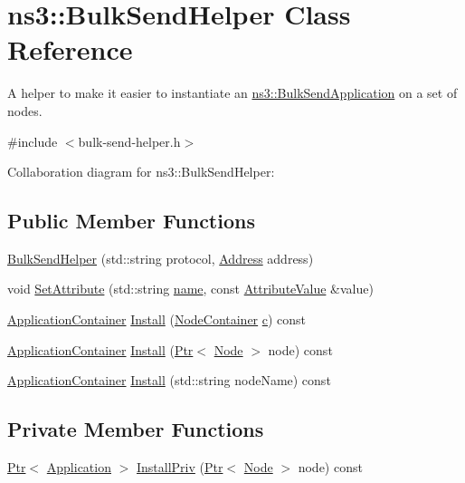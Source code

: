 \hypertarget{classns3_1_1BulkSendHelper}{}\section{ns3\+:\+:Bulk\+Send\+Helper Class Reference}
\label{classns3_1_1BulkSendHelper}


A helper to make it easier to instantiate an \hyperlink{classns3_1_1BulkSendApplication}{ns3\+::\+Bulk\+Send\+Application} on a set of nodes.  




{\ttfamily \#include $<$bulk-\/send-\/helper.\+h$>$}



Collaboration diagram for ns3\+:\+:Bulk\+Send\+Helper\+:
\subsection*{Public Member Functions}
\begin{DoxyCompactItemize}
\item 
\hyperlink{classns3_1_1BulkSendHelper_ad2ce134f59fa593314538b8731ae6977}{Bulk\+Send\+Helper} (std\+::string protocol, \hyperlink{classns3_1_1Address}{Address} address)
\item 
void \hyperlink{classns3_1_1BulkSendHelper_a18d20e1c180046edd5ee03c67d15c1bf}{Set\+Attribute} (std\+::string \hyperlink{generate__test__data__lte__spectrum__model_8m_ab74e6bf80237ddc4109968cedc58c151}{name}, const \hyperlink{classns3_1_1AttributeValue}{Attribute\+Value} \&value)
\item 
\hyperlink{classns3_1_1ApplicationContainer}{Application\+Container} \hyperlink{classns3_1_1BulkSendHelper_ad00bd97043d10f38d2a93384468f787b}{Install} (\hyperlink{classns3_1_1NodeContainer}{Node\+Container} \hyperlink{mmwave_2model_2fading-traces_2fading__trace__generator_8m_ae0323a9039add2978bf5b49550572c7c}{c}) const 
\item 
\hyperlink{classns3_1_1ApplicationContainer}{Application\+Container} \hyperlink{classns3_1_1BulkSendHelper_adcc985ebc913a45450ca78dcd1096e63}{Install} (\hyperlink{classns3_1_1Ptr}{Ptr}$<$ \hyperlink{classns3_1_1Node}{Node} $>$ node) const 
\item 
\hyperlink{classns3_1_1ApplicationContainer}{Application\+Container} \hyperlink{classns3_1_1BulkSendHelper_a575eb2680a423c20b202a7d0a1a8cc73}{Install} (std\+::string node\+Name) const 
\end{DoxyCompactItemize}
\subsection*{Private Member Functions}
\begin{DoxyCompactItemize}
\item 
\hyperlink{classns3_1_1Ptr}{Ptr}$<$ \hyperlink{classns3_1_1Application}{Application} $>$ \hyperlink{classns3_1_1BulkSendHelper_af37244b494c47188464fe9a6f5b60768}{Install\+Priv} (\hyperlink{classns3_1_1Ptr}{Ptr}$<$ \hyperlink{classns3_1_1Node}{Node} $>$ node) const 
\end{DoxyCompactItemize}
